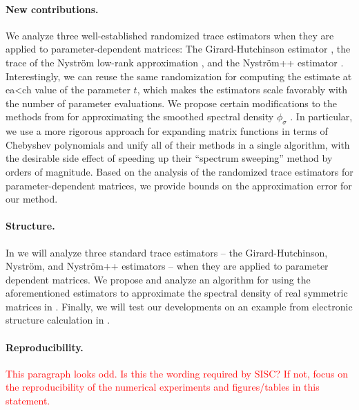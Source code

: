 \paragraph{New contributions.} We analyze three well-established randomized trace estimators when they are applied to parameter-dependent matrices: The Girard-Hutchinson estimator \cite{girard-1989-fast-montecarlo, hutchinson-1990-stochastic-estimator}, the trace of the Nyström low-rank approximation \cite{gittens-2013-revisiting-nystrom}, and the Nyström++ estimator \cite{persson-2022-improved-variants}. Interestingly, we can reuse the same randomization for computing the estimate at ea<ch value of the parameter $t$, which makes the estimators scale favorably with the number of parameter evaluations. We propose certain modifications to the methods from \cite{lin-2017-randomized-estimation} for approximating the smoothed spectral density $\phi_{\sigma}$ . In particular, we use a more rigorous approach for expanding matrix functions in terms of Chebyshev polynomials and unify all of their methods in a single algorithm, with the desirable side effect of speeding up their \enquote{spectrum sweeping} method by orders of magnitude. Based on the analysis of the randomized trace estimators for parameter-dependent matrices, we provide bounds on the approximation error for our method.

\paragraph{Structure.} In  we will analyze three standard trace estimators -- the Girard-Hutchinson, Nyström, and Nyström++ estimators -- when they are applied to parameter dependent matrices. We propose and analyze an algorithm for using the aforementioned estimators to approximate the spectral density of real symmetric matrices in . Finally, we will test our developments on an example from electronic structure calculation in .

\paragraph{Reproducibility.} \textcolor{red}{This paragraph looks odd. Is this the wording required by SISC? If not, focus on the reproducibility of the numerical experiments and figures/tables in this statement.}  
